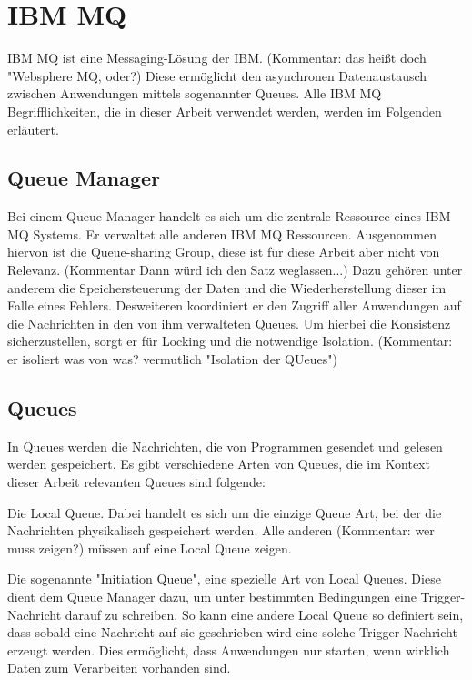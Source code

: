 \section{IBM MQ}\label{sec:mq}
IBM MQ ist eine Messaging-Lösung der IBM. (Kommentar: das heißt doch "Websphere MQ, oder?)
Diese ermöglicht den asynchronen Datenaustausch zwischen Anwendungen mittels sogenannter Queues.
Alle IBM MQ Begrifflichkeiten, die in dieser Arbeit verwendet werden, werden im Folgenden erläutert.
\cite{Aranha.2013}

\subsection{Queue Manager}
Bei einem Queue Manager handelt es sich um die zentrale Ressource eines IBM MQ Systems.
Er verwaltet  alle anderen IBM MQ Ressourcen.
Ausgenommen hiervon ist die Queue-sharing Group, diese ist für diese Arbeit aber nicht von Relevanz. (Kommentar Dann würd ich den Satz weglassen...)
Dazu gehören unter anderem die Speichersteuerung der Daten und die Wiederherstellung dieser im Falle eines Fehlers.
Desweiteren koordiniert er den Zugriff aller Anwendungen auf die Nachrichten in den von ihm verwalteten Queues.
Um hierbei die Konsistenz sicherzustellen, sorgt er für Locking und die notwendige Isolation. (Kommentar: er isoliert was von was?  vermutlich "Isolation der QUeues")
\cite{Aranha.2013}

\subsection{Queues}
In Queues werden die Nachrichten, die von Programmen gesendet und gelesen werden gespeichert.
Es gibt verschiedene Arten von Queues, die im Kontext dieser Arbeit relevanten Queues sind folgende:

Die Local Queue.
Dabei handelt es sich um die einzige Queue Art, bei der die Nachrichten physikalisch gespeichert werden.
Alle anderen (Kommentar: wer muss zeigen?)  müssen auf eine Local Queue zeigen.

Die sogenannte "Initiation Queue", eine spezielle Art von Local Queues.
Diese dient dem Queue Manager dazu, um unter bestimmten Bedingungen eine Trigger-Nachricht darauf zu schreiben.
So kann eine andere Local Queue so definiert sein, dass sobald eine Nachricht auf sie geschrieben wird eine solche Trigger-Nachricht erzeugt werden.
Dies ermöglicht, dass Anwendungen nur starten, wenn wirklich Daten zum Verarbeiten vorhanden sind.
\cite{Aranha.2013}


